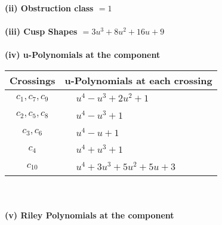 \documentclass[1p]{elsarticle_modified}
\theoremstyle{definition}
\begin{document}
\flushleft \textbf{(ii) Obstruction class $= 1$}\\~\\
\flushleft \textbf{(iii) Cusp Shapes $= 3 u^3+8 u^2+16 u+9$}\\~\\
\newpage\renewcommand{\arraystretch}{1}
\flushleft \textbf{(iv) u-Polynomials at the component}\newline \\
\begin{tabular}{m{50pt}|m{274pt}}
Crossings & \hspace{64pt}u-Polynomials at each crossing \\
\hline $$\begin{aligned}c_{1},c_{7},c_{9}\end{aligned}$$&$\begin{aligned}
&u^4- u^3+2 u^2+1
\end{aligned}$\\
\hline $$\begin{aligned}c_{2},c_{5},c_{8}\end{aligned}$$&$\begin{aligned}
&u^4- u^3+1
\end{aligned}$\\
\hline $$\begin{aligned}c_{3},c_{6}\end{aligned}$$&$\begin{aligned}
&u^4- u+1
\end{aligned}$\\
\hline $$\begin{aligned}c_{4}\end{aligned}$$&$\begin{aligned}
&u^4+u^3+1
\end{aligned}$\\
\hline $$\begin{aligned}c_{10}\end{aligned}$$&$\begin{aligned}
&u^4+3 u^3+5 u^2+5 u+3
\end{aligned}$\\
\hline
\end{tabular}\\~\\
\newpage\renewcommand{\arraystretch}{1}
\flushleft \textbf{(v) Riley Polynomials at the component}\newline \\
\end{document}
